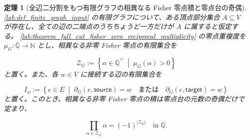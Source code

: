 \documentclass[11pt,a4paper]{article}
\newtheorem{theorem}[definition]{定理}
\theoremstyle{remark}
\begin{document}
\begin{theorem}[全辺二分割をもつ有限グラフの相異なる Fisher 零点積と零点台の奇偶]\label{lab:theorem_full_cut_distinct_fisher_zero_product_support_parity}
\cref{lab:def_finite_graph_input}
 の有限グラフについて、ある頂点部分集合 
$A\subseteq V$
 が存在し、全ての辺の二端点のうちちょうど一方だけが 
$A$
 に属すると仮定する。
\cref{lab:theorem_full_cut_fisher_zero_reciprocal_multiplicity}
 の零点重複度を 
$\mu_G:\overline{\mathbb Q}\to\mathbb N$
 とし、相異なる非零 Fisher 零点の有限集合を

\[\mathcal Z_G:=
\left\{
  \alpha\in\overline{\mathbb Q}^{\times}
  \;\middle|\;
  \mu_G(\alpha)>0
\right\}\]
と置く。また、各 
$w\in V$
 に接続する辺の有限集合を

\[I_w:=
\left\{
  e\in E
  \;\middle|\;
  \partial_G(e,\mathsf{source})=w
  \quad\text{または}\quad
  \partial_G(e,\mathsf{target})=w
\right\}\]
と置く。このとき、相異なる非零 Fisher 零点の積は零点台の元数の奇偶だけで定まり、

\[\prod_{\alpha\in\mathcal Z_G}\alpha
=(-1)^{|\mathcal Z_G|}
\quad\text{in }\overline{\mathbb Q}.\]
\end{theorem}
\end{document}

